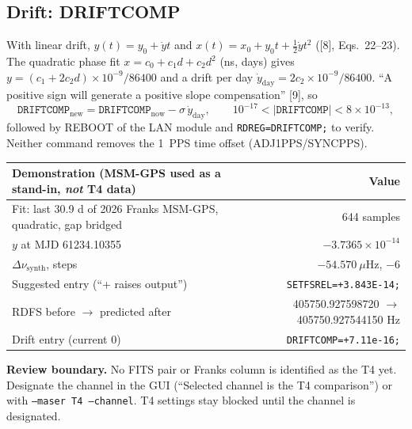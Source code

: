 \documentclass[11pt,a4paper]{article}
\newcommand{\tfourman}{[8]}
\newcommand{\tfournet}{[9]}
\newcommand{\warning}[1]{\par\noindent\colorbox{light}{\parbox{\dimexpr\linewidth-2\fboxsep}{\textbf{Review boundary.} #1}}\par}
\begin{document}
\subsection{Drift: DRIFTCOMP}
With linear drift, $y(t)=y_0+\dot y t$ and $x(t)=x_0+y_0t+\tfrac12\dot y t^2$ (\tfourman, Eqs.~22--23).
The quadratic phase fit $x=c_0+c_1d+c_2d^2$ (ns, days) gives
$y=(c_1+2c_2d)\times10^{-9}/86400$ and a drift per day
$\dot y_{\mathrm{day}}=2c_2\times10^{-9}/86400$. ``A positive sign will generate a positive slope
compensation'' \tfournet, so
\[
\texttt{DRIFTCOMP}_{\mathrm{new}}=\texttt{DRIFTCOMP}_{\mathrm{now}}-\sigma\,\dot y_{\mathrm{day}},
\qquad 10^{-17}<|\texttt{DRIFTCOMP}|<8\times10^{-13},
\]
followed by REBOOT of the LAN module and \texttt{RDREG=DRIFTCOMP;} to verify. Neither command
removes the 1~PPS time offset (ADJ1PPS/SYNCPPS).

\begin{center}
\small
\begin{tabular}{@{}lr@{}}
\toprule
Demonstration (MSM-GPS used as a stand-in, \emph{not} T4 data) & Value\\
\midrule
Fit: last 30.9 d of 2026 Franks MSM-GPS, quadratic, gap bridged & 644 samples\\
$y$ at MJD 61234.10355 & $-3.7365\times10^{-14}$\\
$\Delta\nu_{\mathrm{synth}}$, steps & $-54.570~\mu$Hz, $-6$\\
Suggested entry (``+ raises output'') & \texttt{SETFSREL=+3.843E-14;}\\
RDFS before $\rightarrow$ predicted after & 405750.927598720 $\rightarrow$ 405750.927544150 Hz\\
Drift entry (current 0) & \texttt{DRIFTCOMP=+7.11e-16;}\\
\bottomrule
\end{tabular}
\end{center}

\warning{No FITS pair or Franks column is identified as the T4 yet. Designate the channel
in the GUI (``Selected channel is the T4 comparison'') or with \texttt{--maser T4 --channel}.
T4 settings stay blocked until the channel is designated.}
\end{document}
